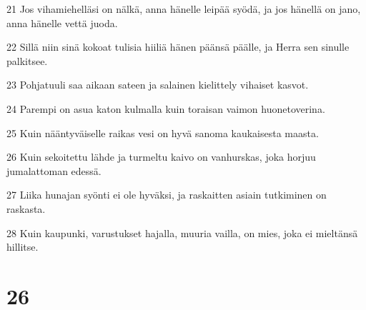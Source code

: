 \par 21 Jos vihamiehelläsi on nälkä, anna hänelle leipää syödä, ja jos hänellä on jano, anna hänelle vettä juoda.
\par 22 Sillä niin sinä kokoat tulisia hiiliä hänen päänsä päälle, ja Herra sen sinulle palkitsee.
\par 23 Pohjatuuli saa aikaan sateen ja salainen kielittely vihaiset kasvot.
\par 24 Parempi on asua katon kulmalla kuin toraisan vaimon huonetoverina.
\par 25 Kuin nääntyväiselle raikas vesi on hyvä sanoma kaukaisesta maasta.
\par 26 Kuin sekoitettu lähde ja turmeltu kaivo on vanhurskas, joka horjuu jumalattoman edessä.
\par 27 Liika hunajan syönti ei ole hyväksi, ja raskaitten asiain tutkiminen on raskasta.
\par 28 Kuin kaupunki, varustukset hajalla, muuria vailla, on mies, joka ei mieltänsä hillitse.

\chapter{26}

